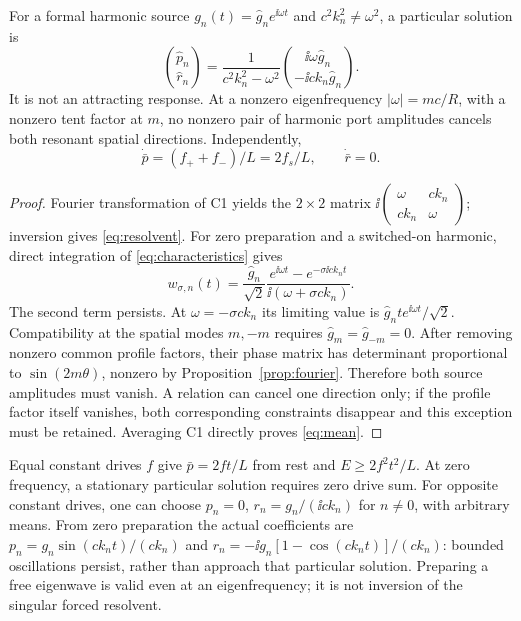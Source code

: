 \begin{theorem}\label{thm:resonance}
For a formal harmonic source $g_n(t)=\widehat g_ne^{\ii\omega t}$ and $c^2k_n^2\ne\omega^2$, a particular solution is
\begin{equation}\label{eq:resolvent}
 \binom{\widehat p_n}{\widehat r_n}
 =\frac1{c^2k_n^2-\omega^2}\binom{\ii\omega\widehat g_n}{-\ii ck_n\widehat g_n}.
\end{equation}
It is not an attracting response. At a nonzero eigenfrequency $|\omega|=mc/R$, with a nonzero tent factor at $m$, no nonzero pair of harmonic port amplitudes cancels both resonant spatial directions. Independently,
\begin{equation}\label{eq:mean}
 \dot{\bar p}=(f_++f_-)/L=2f_s/L,\qquad \dot{\bar r}=0.
\end{equation}
\end{theorem}
\begin{proof}
Fourier transformation of C1 yields the $2\times2$ matrix $\ii\left(\begin{smallmatrix}\omega&ck_n\\ck_n&\omega\end{smallmatrix}\right)$; inversion gives \eqref{eq:resolvent}. For zero preparation and a switched-on harmonic, direct integration of \eqref{eq:characteristics} gives
\begin{equation}\label{eq:switchedharmonic}
 w_{\sigma,n}(t)=\frac{\widehat g_n}{\sqrt2}
 \frac{e^{\ii\omega t}-e^{-\sigma\ii ck_nt}}{\ii(\omega+\sigma ck_n)}.
\end{equation}
The second term persists. At $\omega=-\sigma ck_n$ its limiting value is $\widehat g_nt e^{\ii\omega t}/\sqrt2$. Compatibility at the spatial modes $m,-m$ requires $\widehat g_m=\widehat g_{-m}=0$. After removing nonzero common profile factors, their phase matrix has determinant proportional to $\sin(2m\theta)$, nonzero by Proposition~\ref{prop:fourier}. Therefore both source amplitudes must vanish. A relation can cancel one direction only; if the profile factor itself vanishes, both corresponding constraints disappear and this exception must be retained. Averaging C1 directly proves \eqref{eq:mean}.
\end{proof}

Equal constant drives $f$ give $\bar p=2ft/L$ from rest and $E\ge2f^2t^2/L$. At zero frequency, a stationary particular solution requires zero drive sum. For opposite constant drives, one can choose $p_n=0$, $r_n=g_n/(\ii ck_n)$ for $n\ne0$, with arbitrary means. From zero preparation the actual coefficients are $p_n=g_n\sin(ck_nt)/(ck_n)$ and $r_n=-\ii g_n[1-\cos(ck_nt)]/(ck_n)$: bounded oscillations persist, rather than approach that particular solution. Preparing a free eigenwave is valid even at an eigenfrequency; it is not inversion of the singular forced resolvent.

